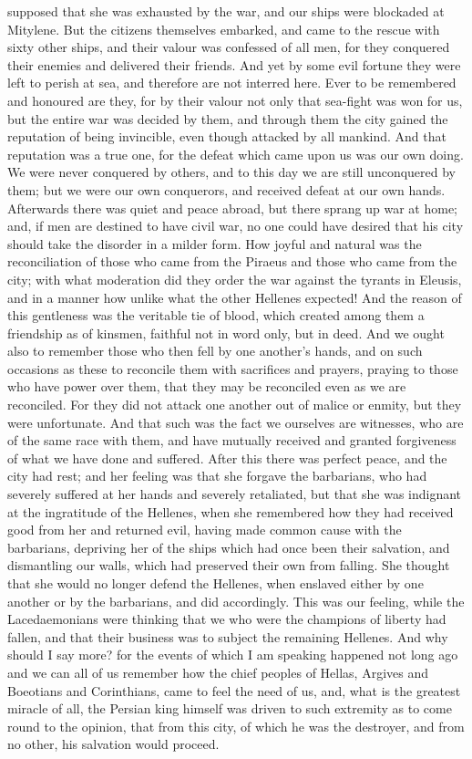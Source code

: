 \documentclass[11pt,letter]{article}
\begin{document}
supposed that she was exhausted by the war, and our ships were blockaded at Mitylene. But the citizens themselves embarked, and came to the rescue with sixty other ships, and their valour was confessed of all men, for they conquered their enemies and delivered their friends. And yet by some evil fortune they were left to perish at sea, and therefore are not interred here. Ever to be remembered and honoured are they, for by their valour not only that sea-fight was won for us, but the entire war was decided by them, and through them the city gained the reputation of being invincible, even though attacked by all mankind. And that reputation was a true one, for the defeat which came upon us was our own doing. We were never conquered by others, and to this day we are still unconquered by them; but we were our own conquerors, and received defeat at our own hands. Afterwards there was quiet and peace abroad, but there sprang up war at home; and, if men are destined to have civil war, no one could have desired that his city should take the disorder in a milder form. How joyful and natural was the reconciliation of those who came from the Piraeus and those who came from the city; with what moderation did they order the war against the tyrants in Eleusis, and in a manner how unlike what the other Hellenes expected! And the reason of this gentleness was the veritable tie of blood, which created among them a friendship as of kinsmen, faithful not in word only, but in deed. And we ought also to remember those who then fell by one another's hands, and on such occasions as these to reconcile them with sacrifices and prayers, praying to those who have power over them, that they may be reconciled even as we are reconciled. For they did not attack one another out of malice or enmity, but they were unfortunate. And that such was the fact we ourselves are witnesses, who are of the same race with them, and have mutually received and granted forgiveness of what we have done and suffered. After this there was perfect peace, and the city had rest; and her feeling was that she forgave the barbarians, who had severely suffered at her hands and severely retaliated, but that she was indignant at the ingratitude of the Hellenes, when she remembered how they had received good from her and returned evil, having made common cause with the barbarians, depriving her of the ships which had once been their salvation, and dismantling our walls, which had preserved their own from falling. She thought that she would no longer defend the Hellenes, when enslaved either by one another or by the barbarians, and did accordingly. This was our feeling, while the Lacedaemonians were thinking that we who were the champions of liberty had fallen, and that their business was to subject the remaining Hellenes. And why should I say more? for the events of which I am speaking happened not long ago and we can all of us remember how the chief peoples of Hellas, Argives and Boeotians and Corinthians, came to feel the need of us, and, what is the greatest miracle of all, the Persian king himself was driven to such extremity as to come round to the opinion, that from this city, of which he was the destroyer, and from no other, his salvation would proceed.
\end{document}
